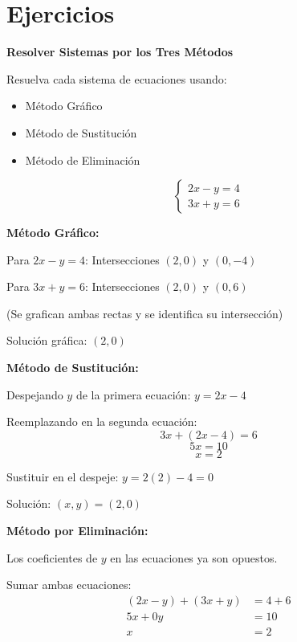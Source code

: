 
\section{Ejercicios}

\begin{exercise}
\textbf{Resolver Sistemas por los Tres Métodos}

Resuelva cada sistema de ecuaciones usando:
\begin{itemize}
    \item Método Gráfico
    \item Método de Sustitución
    \item Método de Eliminación
\end{itemize}

\problem $$\begin{cases}2x - y = 4 \\ 3x + y = 6\end{cases}$$

\begin{solucion}
\textbf{Método Gráfico:}

Para $2x - y = 4$: Intersecciones $(2, 0)$ y $(0, -4)$

Para $3x + y = 6$: Intersecciones $(2, 0)$ y $(0, 6)$

(Se grafican ambas rectas y se identifica su intersección)

Solución gráfica: $(2, 0)$

\vspace{0.3cm}

\textbf{Método de Sustitución:}

Despejando $y$ de la primera ecuación: $y = 2x - 4$

Reemplazando en la segunda ecuación:
$$3x + (2x - 4) = 6$$
$$5x = 10$$
$$x = 2$$

Sustituir en el despeje: $y = 2(2) - 4 = 0$

Solución: $(x,y) = (2,0)$

\vspace{0.3cm}

\textbf{Método por Eliminación:}

Los coeficientes de $y$ en las ecuaciones ya son opuestos.

Sumar ambas ecuaciones:
$$\begin{aligned}
(2x - y) + (3x + y) &= 4 + 6 \\
5x + 0y &= 10 \\
x &= 2
\end{aligned}$$


\end{solucion}
\end{exercise}
